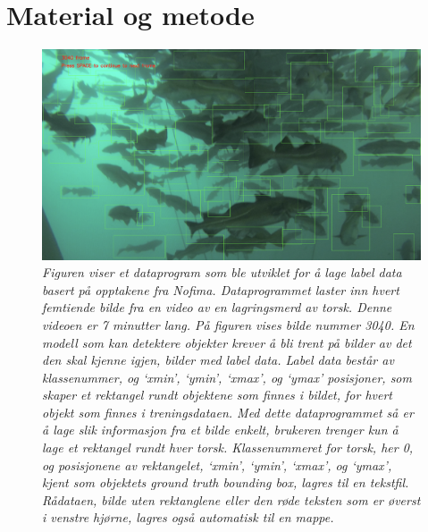 


\section{Material og metode}

\begin{figure}[h!]
\begin{center} 
\includegraphics[scale=0.35]{figures/dataset_tool_2}
\caption{\small \sl Figuren viser et dataprogram som ble utviklet for å lage label data basert på opptakene fra Nofima. Dataprogrammet laster inn hvert femtiende bilde fra en video av en lagringsmerd av torsk. Denne videoen er 7 minutter lang. På figuren vises bilde nummer 3040. En modell som kan detektere objekter krever å bli trent på bilder av det den skal kjenne igjen, bilder med label data. Label data består av klassenummer, og `xmin', `ymin', `xmax', og `ymax' posisjoner, som skaper et rektangel rundt objektene som finnes i bildet, for hvert objekt som finnes i treningsdataen. Med dette dataprogrammet så er å lage slik informasjon fra et bilde enkelt, brukeren trenger kun å lage et rektangel rundt hver torsk. Klassenummeret for torsk, her 0, og posisjonene av rektangelet, `xmin', `ymin', `xmax', og `ymax', kjent som objektets ground truth bounding box, lagres til en tekstfil. Rådataen, bilde uten rektanglene eller den røde teksten som er øverst i venstre hjørne, lagres også automatisk til en mappe. \label{fig:dataset_tool}} 
\end{center} 
\end{figure} 

